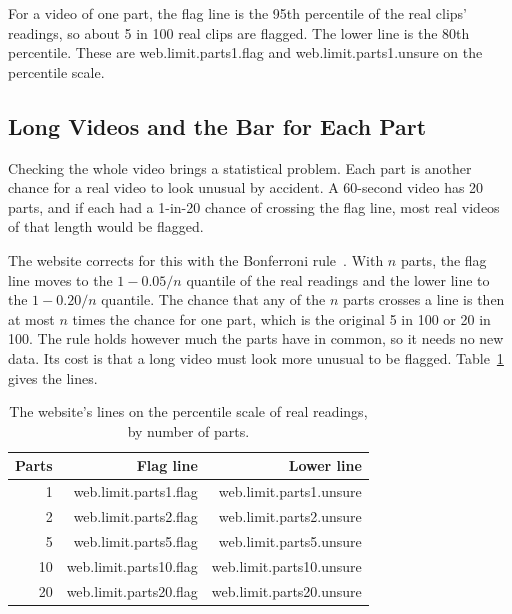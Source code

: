 For a video of one part, the flag line is the 95th percentile of the real
clips' readings, so about 5 in 100 real clips are flagged. The lower line is
the 80th percentile. These are {{web.limit.parts1.flag}} and
{{web.limit.parts1.unsure}} on the percentile scale.

\subsection{Long Videos and the Bar for Each Part}

Checking the whole video brings a statistical problem. Each part is another
chance for a real video to look unusual by accident. A 60-second video has 20
parts, and if each had a 1-in-20 chance of crossing the flag line, most real
videos of that length would be flagged.

The website corrects for this with the Bonferroni rule~\cite{dunn}. With $n$
parts, the flag line moves to the $1 - 0.05/n$ quantile of the real readings
and the lower line to the $1 - 0.20/n$ quantile. The chance that any of the
$n$ parts crosses a line is then at most $n$ times the chance for one part,
which is the original 5 in 100 or 20 in 100. The rule holds however much the
parts have in common, so it needs no new data. Its cost is that a long video
must look more unusual to be flagged. Table~\ref{tab:web-lines} gives the
lines.

\begin{table}[ht]
    \centering
    \small
    \caption{The website's lines on the percentile scale of real readings, by number of parts.}
    \label{tab:web-lines}
    \begin{tabular}{@{}r r r@{}}
        \toprule
        \textbf{Parts} & \textbf{Flag line} & \textbf{Lower line} \\
        \midrule
        1 & {{web.limit.parts1.flag}} & {{web.limit.parts1.unsure}} \\
        2 & {{web.limit.parts2.flag}} & {{web.limit.parts2.unsure}} \\
        5 & {{web.limit.parts5.flag}} & {{web.limit.parts5.unsure}} \\
        10 & {{web.limit.parts10.flag}} & {{web.limit.parts10.unsure}} \\
        20 & {{web.limit.parts20.flag}} & {{web.limit.parts20.unsure}} \\
        \bottomrule
    \end{tabular}
\end{table}

